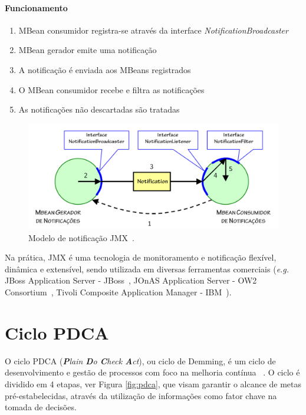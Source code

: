 \paragraph{Funcionamento} 
\begin{enumerate}
\item MBean consumidor registra-se através da interface \textit{NotificationBroadcaster}

\item MBean gerador emite uma notificação

\item A notificação é enviada aos MBeans registrados

\item O MBean consumidor recebe e filtra as notificações

\item As notificações não descartadas são tratadas
\end{enumerate}

\begin{figure}[htp]
\centering
\includegraphics[width=13cm]{chapters/chapter2/notification_model.png}
\caption[Modelo de notificação JMX]{Modelo de notificação JMX~\cite{pericasgerencia}.}
\label{fig:notifyjmx}
\end{figure}

Na prática, JMX é uma tecnologia de monitoramento e notificação flexível, dinâmica e extensível, sendo utilizada em diversas ferramentas comerciais (\textit{e.g. } JBoss Application Server - JBoss~\cite{jboss}, JOnAS Application Server - OW2 Consortium~\cite{jonas}, Tivoli Composite Application Manager - IBM~\cite{tivoli}). 

\section{Ciclo PDCA}
\label{sec:pdca}
O ciclo PDCA (\textit{\textbf{P}lain \textbf{D}o \textbf{C}heck \textbf{A}ct}), ou ciclo de  Demming, é um ciclo de desenvolvimento e gestão de processos com foco na melhoria contínua ~\cite{shewhart}. O ciclo é dividido em 4 etapas, ver Figura \ref{fig:pdca}, que visam garantir o alcance de metas pré-estabelecidas, através da utilização de informações como fator chave na tomada de decisões.

